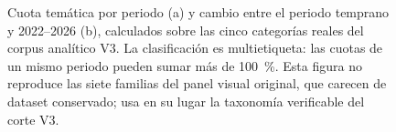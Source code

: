 \begin{figure}[!htbp]
\begin{minipage}[t]{0.40\linewidth}
{}
  \end{minipage}
  \caption[Cuota temática por periodo y cambio temprano-reciente.]{Cuota temática
  por periodo (a) y cambio entre el periodo temprano y 2022--2026 (b), calculados
  sobre las cinco categorías reales del corpus analítico V3. La clasificación es
  multietiqueta: las cuotas de un mismo periodo pueden sumar más de 100~\%. Esta
  figura no reproduce las siete familias del panel visual original, que carecen
  de dataset conservado; usa en su lugar la taxonomía verificable del corte V3.}
  \label{fig:lit-period-shift}
\end{figure}
